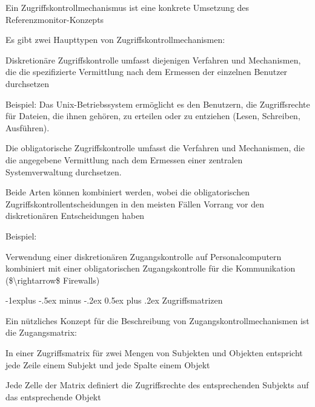 \documentclass[a4paper]{article}
\makeatletter
\renewcommand{\subsection}{\@startsection{subsection}{2}{0mm}%
 {-1explus -.5ex minus -.2ex}%
 {0.5ex plus .2ex}%
 {\normalfont\normalsize\bfseries}}
\makeatother
\begin{document}
\begin{multicols}{3}
      \begin{itemize*}
            \item Ein Zugriffskontrollmechanismus ist eine konkrete Umsetzung des
            Referenzmonitor-Konzepts
            \item Es gibt zwei Haupttypen von Zugriffskontrollmechanismen:
            \begin{itemize*}
                  \item Diskretionäre Zugriffskontrolle umfasst diejenigen Verfahren und Mechanismen, die die spezifizierte Vermittlung nach dem Ermessen der einzelnen Benutzer durchsetzen
                  \begin{itemize*} \item Beispiel: Das Unix-Betriebssystem ermöglicht es den Benutzern, die Zugriffsrechte für Dateien, die ihnen gehören, zu erteilen oder zu entziehen (Lesen, Schreiben, Ausführen). \end{itemize*}
                  \item Die obligatorische Zugriffskontrolle umfasst die Verfahren und Mechanismen, die die angegebene Vermittlung nach dem Ermessen einer zentralen Systemverwaltung durchsetzen.
            \end{itemize*}
            \item Beide Arten können kombiniert werden, wobei die obligatorischen
            Zugriffskontrollentscheidungen in den meisten Fällen Vorrang vor den
            diskretionären Entscheidungen haben
            \begin{itemize*}
                  \item Beispiel:
                  \begin{itemize*} \item Verwendung einer diskretionären Zugangskontrolle auf Personalcomputern kombiniert mit einer obligatorischen Zugangskontrolle für die Kommunikation (\$\textbackslash rightarrow\$ Firewalls) \end{itemize*}
            \end{itemize*}
      \end{itemize*}


      \subsection{Zugriffsmatrizen}

      \begin{itemize*}
            \item Ein nützliches Konzept für die Beschreibung von
            Zugangskontrollmechanismen ist die Zugangsmatrix:
            \begin{itemize*}
                  \item In einer Zugriffsmatrix für zwei Mengen von Subjekten und Objekten entspricht jede Zeile einem Subjekt und jede Spalte einem Objekt
                  \item Jede Zelle der Matrix definiert die Zugriffsrechte des entsprechenden Subjekts auf das entsprechende Objekt
            \end{itemize*}
      \end{itemize*}


\end{multicols}
\end{document}
